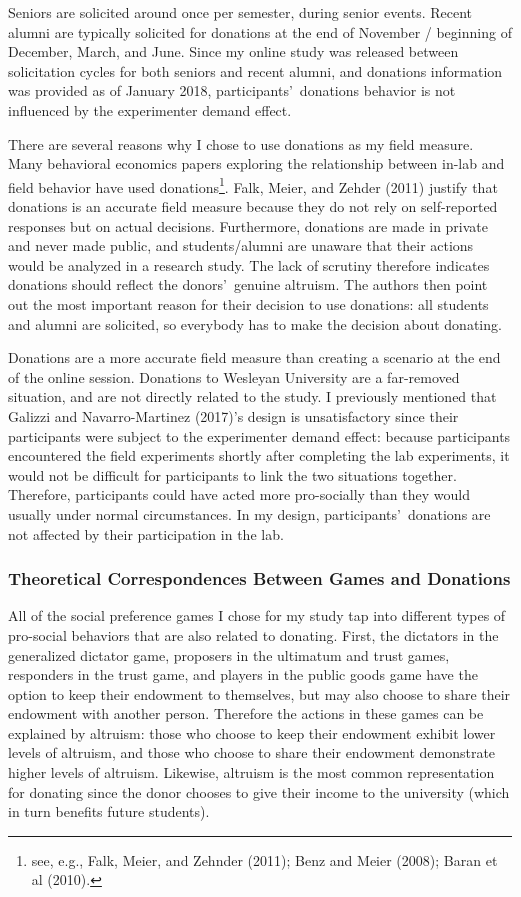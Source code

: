\documentclass[12pt]{article}
\begin{document}
Seniors are solicited around once per semester, during senior events. Recent alumni are typically solicited for donations at the end of November / beginning of December, March, and June. Since my online study was released between solicitation cycles for both seniors and recent alumni, and donations information was provided as of January 2018, participants\rq \ donations behavior is not influenced by the experimenter demand effect. 

There are several reasons why I chose to use donations as my field measure. Many behavioral economics papers exploring the relationship between in-lab and field behavior have used donations\footnote{see, e.g., Falk, Meier, and Zehnder (2011); Benz and Meier (2008); Baran et al (2010).}. Falk, Meier, and Zehder (2011) justify that donations is an accurate field measure because they do not rely on self-reported responses but on actual decisions. Furthermore, donations are made in private and never made public, and students/alumni are unaware that their actions would be analyzed in a research study. The lack of scrutiny therefore indicates donations should reflect the donors\rq \ genuine altruism. The authors then point out the most important reason for their decision to use donations: all students and alumni are solicited, so everybody has to make the decision about donating.

Donations are a more accurate field measure than creating a scenario at the end of the online session. Donations to Wesleyan University are a far-removed situation, and are not directly related to the study. I previously mentioned that Galizzi and Navarro-Martinez (2017)\rq s design is unsatisfactory since their participants were subject to the experimenter demand effect: because participants encountered the field experiments shortly after completing the lab experiments, it would not be difficult for participants to link the two situations together. Therefore, participants could have acted more pro-socially than they would usually under normal circumstances. In my design, participants\rq \ donations are not affected by their participation in the lab.

\subsubsection{Theoretical Correspondences Between Games and Donations}

All of the social preference games I chose for my study tap into different types of pro-social behaviors that are also related to donating. First, the dictators in the generalized dictator game, proposers in the ultimatum and trust games, responders in the trust game, and players in the public goods game have the option to keep their endowment to themselves, but may also choose to share their endowment with another person. Therefore the actions in these games can be explained by altruism: those who choose to keep their endowment exhibit lower levels of altruism, and those who choose to share their endowment demonstrate higher levels of altruism. Likewise, altruism is the most common representation for donating since the donor chooses to give their income to the university (which in turn benefits future students). 
\end{document}
